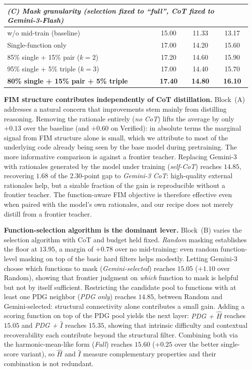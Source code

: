 \begin{table}[t]
\begin{tabular}{lccc}
\midrule
\multicolumn{4}{l}{\emph{(C) Mask granularity (selection fixed to ``full'', CoT fixed to Gemini-3-Flash)}} \\
\midrule
w/o mid-train (baseline)             & 15.00 & 11.33 & 13.17 \\
Single-function only                 & 17.00 & 14.20 & 15.60 \\
85\% single + 15\% pair ($k=2$)       & 17.20 & 14.60 & 15.90 \\
95\% single + 5\% triple ($k=3$)      & 17.00 & 14.40 & 15.70 \\
\textbf{80\% single + 15\% pair + 5\% triple} & \textbf{17.40} & \textbf{14.80} & \textbf{16.10} \\
\bottomrule
\end{tabular}
\end{table}

\textbf{FIM structure contributes independently of CoT distillation.}
Block~(A) addresses a natural concern that improvements stem mainly
from distilling reasoning. Removing the rationale entirely (\emph{no
CoT}) lifts the average by only $+0.13$ over the baseline (and $+0.60$
on Verified): in absolute terms the marginal signal from FIM structure
alone is small, which we attribute to most of the underlying code
already being seen by the base model during pretraining. The more
informative comparison is against a frontier teacher.
Replacing Gemini-3 with rationales
generated by the model under training (\emph{self-CoT}) reaches
$14.85$, recovering $1.68$ of the $2.30$-point gap to \emph{Gemini-3
CoT}: high-quality external rationales help, but a sizable fraction of
the gain is reproducible without a frontier teacher. The function-aware
FIM objective is therefore effective even when paired with the model's
own rationales, and our recipe does not merely distill from a frontier
teacher.

\textbf{Function-selection algorithm is the dominant lever.}
Block~(B) varies the selection algorithm with CoT and budget held
fixed. \emph{Random} masking establishes the floor at $13.95$, a margin
of $+0.78$ over no mid-training: even random function-level masking on
top of the basic hard filters helps modestly. Letting Gemini-3 choose
which functions to mask (\emph{Gemini-selected}) reaches $15.05$
($+1.10$ over Random), showing that frontier judgment on \emph{which}
function to mask is helpful but not by itself sufficient. Restricting
the candidate pool to functions with at least one PDG neighbor
(\emph{PDG only}) reaches $14.85$, between Random and Gemini-selected:
structural connectivity alone contributes a small gain. Adding a
scoring function on top of the PDG pool yields the next layer:
\emph{PDG + $\hat{H}$} reaches $15.05$ and \emph{PDG + $\hat{I}$}
reaches $15.35$, showing that intrinsic difficulty and contextual
recoverability each contribute beyond the structural filter. Combining
both via the harmonic-mean-like form (\emph{Full}) reaches $15.60$
($+0.25$ over the better single-score variant), so $\hat{H}$ and
$\hat{I}$ measure complementary properties and their combination is not
redundant.

